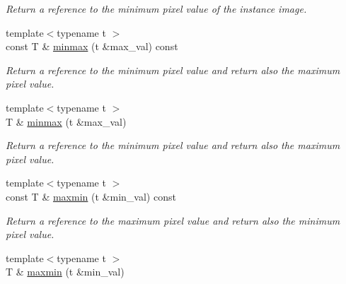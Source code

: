 \begin{DoxyCompactItemize}
\begin{DoxyCompactList}\small\item\em Return a reference to the minimum pixel value of the instance image. \end{DoxyCompactList}\item 
\hypertarget{structcimg__library_1_1_c_img_ac4a25509b9d16b2529ae59b23811e191}{{\footnotesize template$<$typename t $>$ }\\const T \& \hyperlink{structcimg__library_1_1_c_img_ac4a25509b9d16b2529ae59b23811e191}{minmax} (t \&max\-\_\-val) const }\label{structcimg__library_1_1_c_img_ac4a25509b9d16b2529ae59b23811e191}

\begin{DoxyCompactList}\small\item\em Return a reference to the minimum pixel value and return also the maximum pixel value. \end{DoxyCompactList}\item 
\hypertarget{structcimg__library_1_1_c_img_abd5b789aef52a344130139e233c962aa}{{\footnotesize template$<$typename t $>$ }\\T \& \hyperlink{structcimg__library_1_1_c_img_abd5b789aef52a344130139e233c962aa}{minmax} (t \&max\-\_\-val)}\label{structcimg__library_1_1_c_img_abd5b789aef52a344130139e233c962aa}

\begin{DoxyCompactList}\small\item\em Return a reference to the minimum pixel value and return also the maximum pixel value. \end{DoxyCompactList}\item 
\hypertarget{structcimg__library_1_1_c_img_a4c74efea5ee5a59b941b9c5d0fb4df6c}{{\footnotesize template$<$typename t $>$ }\\const T \& \hyperlink{structcimg__library_1_1_c_img_a4c74efea5ee5a59b941b9c5d0fb4df6c}{maxmin} (t \&min\-\_\-val) const }\label{structcimg__library_1_1_c_img_a4c74efea5ee5a59b941b9c5d0fb4df6c}

\begin{DoxyCompactList}\small\item\em Return a reference to the maximum pixel value and return also the minimum pixel value. \end{DoxyCompactList}\item 
\hypertarget{structcimg__library_1_1_c_img_a4a77d2be5fbebd593dba348918734de3}{{\footnotesize template$<$typename t $>$ }\\T \& \hyperlink{structcimg__library_1_1_c_img_a4a77d2be5fbebd593dba348918734de3}{maxmin} (t \&min\-\_\-val)}\label{structcimg__library_1_1_c_img_a4a77d2be5fbebd593dba348918734de3}


\end{DoxyCompactItemize}
